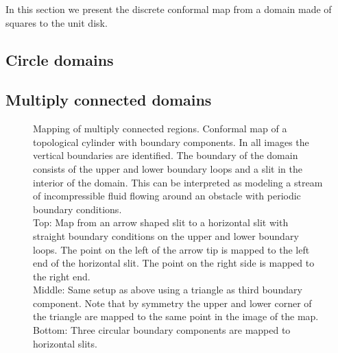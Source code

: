 \documentclass[Thesis.tex]{subfiles}
\begin{document}
In this section we present the discrete conformal map from a domain made of squares to the unit disk.


\subsection{Circle domains}




\subsection{Multiply connected domains}

\begin{figure}
	\centering
\caption{
Mapping of multiply connected regions.
Conformal map of a topological cylinder with boundary components.
In all images the vertical boundaries are identified.
The boundary of the domain consists of the upper and lower boundary loops and a slit in the interior of the domain.
This can be interpreted as modeling a stream of incompressible fluid flowing around an obstacle with periodic boundary conditions.
\\
Top: Map from an arrow shaped slit to a horizontal slit with straight boundary conditions on the upper and lower boundary loops.
The point on the left of the arrow tip is mapped to the left end of the horizontal slit.
The point on the right side is mapped to the right end.
\\
Middle: Same setup as above using a triangle as third boundary component.
Note that by symmetry the upper and lower corner of the triangle are mapped to the same point in the image of the map.
\\
Bottom: Three circular boundary components are mapped to horizontal slits.
}
\label{fig:fluid_flows}
\end{figure}
\end{document}
